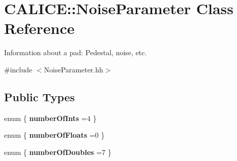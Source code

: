 \section{C\-A\-L\-I\-C\-E\-:\-:Noise\-Parameter Class Reference}
\label{classCALICE_1_1NoiseParameter}


Information about a pad\-: Pedestal, noise, etc.  




{\ttfamily \#include $<$Noise\-Parameter.\-hh$>$}

\subsection*{Public Types}
\begin{DoxyCompactItemize}
\item 
enum \{ {\bfseries number\-Of\-Ints} =4
 \}
\item 
enum \{ {\bfseries number\-Of\-Floats} =0
 \}
\item 
enum \{ {\bfseries number\-Of\-Doubles} =7
 \}
\end{DoxyCompactItemize}
